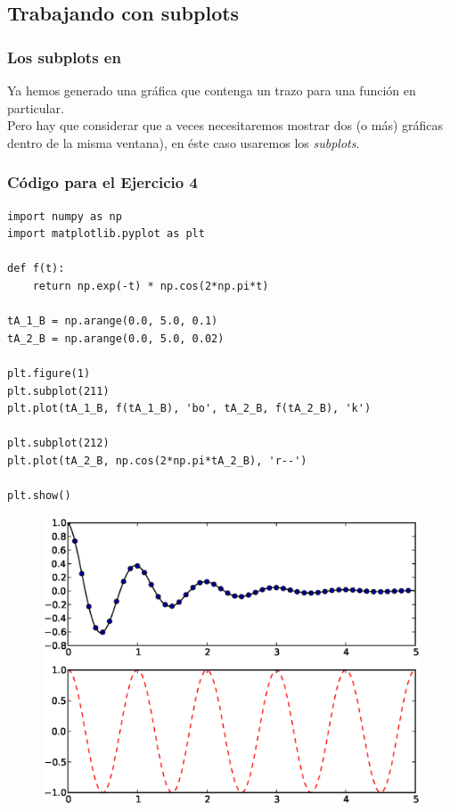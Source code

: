 \subsection{Trabajando con subplots}
\begin{frame}
\frametitle{Los subplots en \python}
Ya hemos generado una gráfica que contenga un trazo para una función en particular.
\\
\bigskip
Pero hay que considerar que a veces necesitaremos mostrar dos (o más) gráficas dentro de la misma ventana), en éste caso usaremos los \emph{subplots}.
\end{frame}
\begin{frame}
\frametitle{Código para el Ejercicio 4}
\begin{lstlisting}[style=codigopython]
import numpy as np
import matplotlib.pyplot as plt

def f(t):
    return np.exp(-t) * np.cos(2*np.pi*t)

tA_1_B = np.arange(0.0, 5.0, 0.1)
tA_2_B = np.arange(0.0, 5.0, 0.02)

plt.figure(1)
plt.subplot(211)
plt.plot(tA_1_B, f(tA_1_B), 'bo', tA_2_B, f(tA_2_B), 'k')

plt.subplot(212)
plt.plot(tA_2_B, np.cos(2*np.pi*tA_2_B), 'r--')

plt.show()
\end{lstlisting}
\end{frame}
\begin{frame}[fragile]
\begin{figure}
	\centering
	\includegraphics[scale=0.5]{Imagenes/plotEjercicio4.eps}
\end{figure}
\end{frame}
